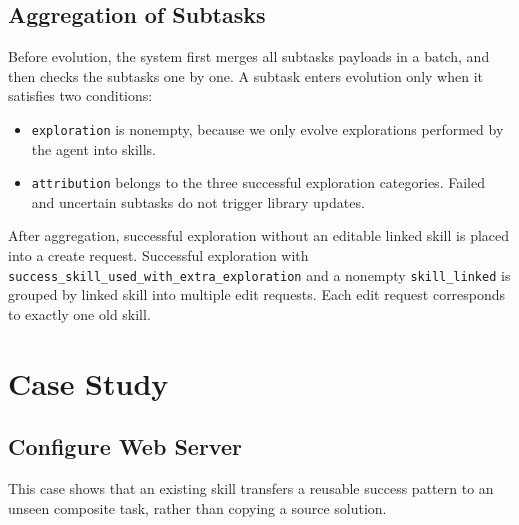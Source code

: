 \documentclass{llmxive}
\providecommand{\svcasebenchmark}[1]{\par\noindent{\sffamily\scriptsize\bfseriesBenchmark: #1}\par\smallskip}
\begin{document}
\subsection{Aggregation of Subtasks}
Before evolution, the system first merges all subtasks payloads in a batch, and then checks the subtasks one by one. A subtask enters evolution only when it satisfies two conditions:
\begin{itemize}
    \item \texttt{exploration} is nonempty, because we only evolve explorations performed by the agent into skills.
    \item \texttt{attribution} belongs to the three successful exploration categories. Failed and uncertain subtasks do not trigger library updates.
\end{itemize}

After aggregation, successful exploration without an editable linked skill is placed into a create request. Successful exploration with \texttt{success\_skill\_used\_with\_extra\_exploration} and a nonempty \texttt{skill\_linked} is grouped by linked skill into multiple edit requests. Each edit request corresponds to exactly one old skill.

\FloatBarrier


\section{Case Study}
\label{app:case-study}

\subsection{Configure Web Server}
\label{app:case-apache-git}
\svcasebenchmark{Terminal-Bench 2.0}

\noindent This case shows that an existing skill transfers a reusable success pattern to an unseen composite task, rather than copying a source solution.\par\medskip
\end{document}
